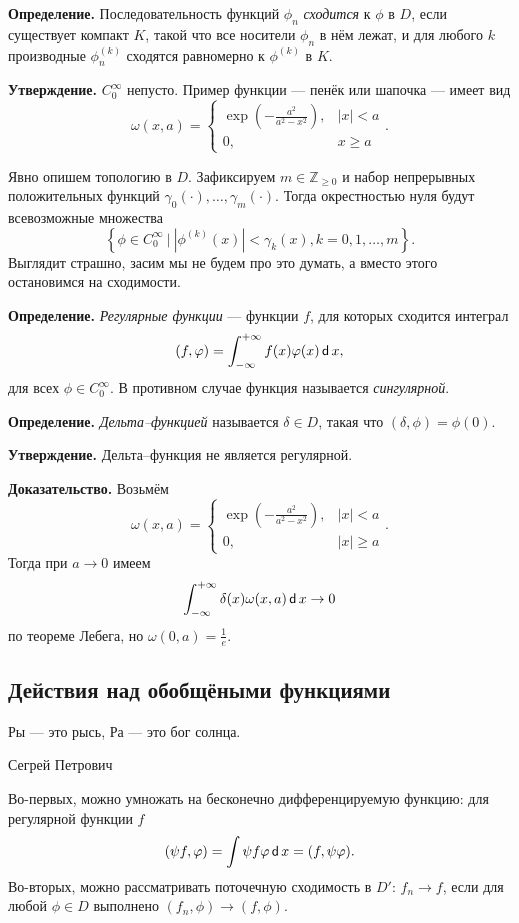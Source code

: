 \textbf{Определение.} Последовательность функций $\phi_n$ \textit{сходится} к $\phi$ в $D$, если существует компакт $K$, такой что все носители $\phi_n$ в нём лежат, и для любого $k$ производные $\phi_n^{(k)}$ сходятся равномерно к $\phi^{(k)}$ в $K$.

\textbf{Утверждение.} $C_0^\infty$ непусто.
Пример функции --- пенёк или шапочка --- имеет вид
\[
    \omega(x, a) =
    \begin{cases}
        \exp \left( - \frac{a^2}{a^2 - x^2} \right), & |x| < a \\
        0, & x \ge a
    \end{cases} .
\]

Явно опишем топологию в $D$.
Зафиксируем $m \in \mathbb Z_{\ge 0}$ и набор непрерывных положительных функций $\gamma_0(\cdot), \dots, \gamma_m(\cdot)$.
Тогда окрестностью нуля будут всевозможные множества
\[
    \left\{ \phi \in C_0^\infty~\bigg|~|\phi^{(k)}(x)| < \gamma_k(x), k = 0, 1, \dots, m \right\}.
\]
Выглядит страшно, засим мы не будем про это думать, а вместо этого остановимся на сходимости.

\textbf{Определение.} \textit{Регулярные функции} --- функции $f$, для которых сходится интеграл
\[
    (f, \varphi) = \int_{-\infty}^{+\infty} f(x) \varphi(x) \operatorname{\mathsf d} x,
\]
для всех $\phi \in C_0^\infty$.
В противном случае функция называется \textit{сингулярной}.

\textbf{Определение.} \textit{Дельта--функцией} называется $\delta \in D$, такая что $(\delta, \phi) = \phi(0)$.

\textbf{Утверждение.} Дельта--функция не является регулярной.

\textbf{Доказательство.} Возьмём
\[
    \omega(x, a) =
    \begin{cases}
        \exp \left( -\frac{a^2}{a^2 - x^2} \right), & |x| < a \\
        0, & |x| \ge a
    \end{cases} .
\]
Тогда при $a \to 0$ имеем
\[
    \int_{-\infty}^{+\infty} \delta(x) \omega(x, a) \operatorname{\mathsf d} x \to 0
\]
по теореме Лебега,
но $\omega(0, a) = \frac{1}{e}$.


\subsection{Действия над обобщёными функциями}
\epigraph{Ры --- это рысь, Ра --- это бог солнца.}{Сегрей Петрович}

Во-первых, можно умножать на бесконечно дифференцируемую функцию: для регулярной функции $f$
\[
    (\psi f, \varphi) = \int \psi f \varphi \operatorname{\mathsf d} x = (f, \psi \varphi).
\]
Во-вторых, можно рассматривать поточечную сходимость в $D'$: $f_n \to f$, если для любой $\phi \in D$ выполнено $(f_n, \phi) \to (f, \phi)$.


